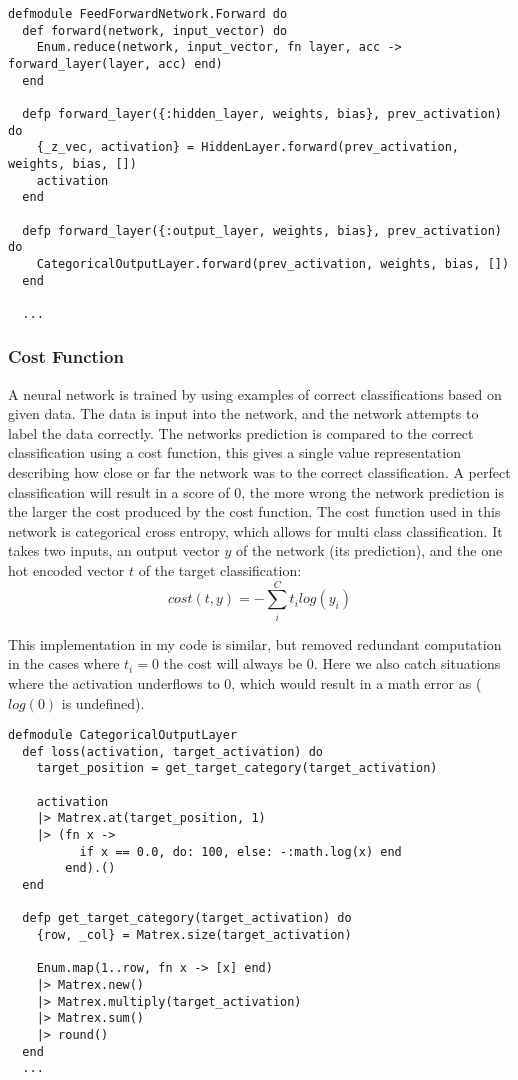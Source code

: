 \begin{lstlisting}
defmodule FeedForwardNetwork.Forward do
  def forward(network, input_vector) do
    Enum.reduce(network, input_vector, fn layer, acc -> forward_layer(layer, acc) end)
  end

  defp forward_layer({:hidden_layer, weights, bias}, prev_activation) do
    {_z_vec, activation} = HiddenLayer.forward(prev_activation, weights, bias, [])
    activation
  end

  defp forward_layer({:output_layer, weights, bias}, prev_activation) do
    CategoricalOutputLayer.forward(prev_activation, weights, bias, [])
  end

  ...
\end{lstlisting}

\subsubsection{Cost Function}
A neural network is trained by using examples of correct classifications based
on given data. The data is input into the network, and the network attempts to
label the data correctly. The networks prediction is compared to the correct
classification using a cost function, this gives a single value representation
describing how close or far the network was to the correct classification. A
perfect classification will result in a score of 0, the more wrong the network
prediction is the larger the cost produced by the cost function. The cost 
function used in this network is categorical cross entropy, which allows for
multi class classification. It takes two inputs, an output vector \(y\) of the network
(its prediction), and the one hot encoded vector \(t\) of the target classification:
\begin{equation}
    cost(t, y) = - \sum_{i}^{C} t_{i}log(y_{i})
\end{equation}

This implementation in my code is similar, but removed redundant computation in
the cases where \(t_{i} = 0\) the cost will always be 0. Here we also catch
situations where the activation underflows to 0, which would result in a math
error as (\(log(0)\) is undefined).
\begin{lstlisting}
defmodule CategoricalOutputLayer
  def loss(activation, target_activation) do
    target_position = get_target_category(target_activation)

    activation
    |> Matrex.at(target_position, 1)
    |> (fn x ->
          if x == 0.0, do: 100, else: -:math.log(x) end
        end).()
  end

  defp get_target_category(target_activation) do
    {row, _col} = Matrex.size(target_activation)

    Enum.map(1..row, fn x -> [x] end)
    |> Matrex.new()
    |> Matrex.multiply(target_activation)
    |> Matrex.sum()
    |> round()
  end
  ...
\end{lstlisting}


